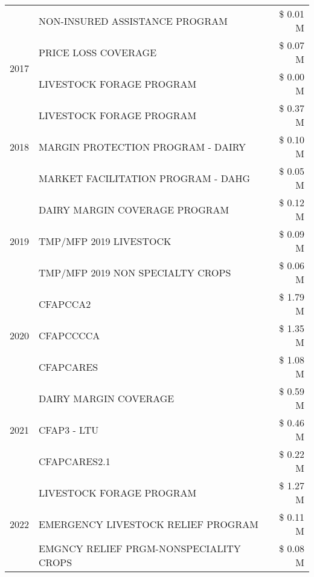 \begin{tabular}{llr}
 & NON-INSURED ASSISTANCE PROGRAM & \$ 0.01 M \\
\cline{1-3}
\multirow[t]{2}{*}{2017} & PRICE LOSS COVERAGE & \$ 0.07 M \\
 & LIVESTOCK FORAGE PROGRAM & \$ 0.00 M \\
\cline{1-3}
\multirow[t]{3}{*}{2018} & LIVESTOCK FORAGE PROGRAM & \$ 0.37 M \\
 & MARGIN PROTECTION PROGRAM - DAIRY & \$ 0.10 M \\
 & MARKET FACILITATION PROGRAM - DAHG & \$ 0.05 M \\
\cline{1-3}
\multirow[t]{3}{*}{2019} & DAIRY MARGIN COVERAGE PROGRAM & \$ 0.12 M \\
 & TMP/MFP 2019 LIVESTOCK & \$ 0.09 M \\
 & TMP/MFP 2019 NON SPECIALTY CROPS & \$ 0.06 M \\
\cline{1-3}
\multirow[t]{3}{*}{2020} & CFAPCCA2 & \$ 1.79 M \\
 & CFAPCCCCA & \$ 1.35 M \\
 & CFAPCARES & \$ 1.08 M \\
\cline{1-3}
\multirow[t]{3}{*}{2021} & DAIRY MARGIN COVERAGE & \$ 0.59 M \\
 & CFAP3 - LTU & \$ 0.46 M \\
 & CFAPCARES2.1 & \$ 0.22 M \\
\cline{1-3}
\multirow[t]{3}{*}{2022} & LIVESTOCK FORAGE PROGRAM & \$ 1.27 M \\
 & EMERGENCY LIVESTOCK RELIEF PROGRAM & \$ 0.11 M \\
 & EMGNCY RELIEF PRGM-NONSPECIALITY CROPS & \$ 0.08 M \\
\cline{1-3}
\bottomrule
\end{tabular}
